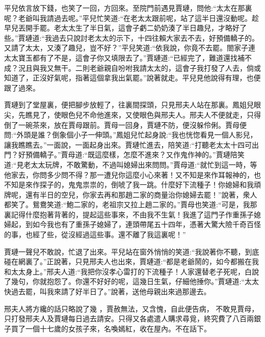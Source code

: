 \begin{parag}
    平兒依言放下錢，也笑了一回，方回來。至院門前遇見賈璉，問他:“太太在那裏呢？老爺叫我請過去呢。”平兒忙笑道:“在老太太跟前呢，站了這半日還沒動呢。趁早兒丟開手罷。老太太生了半日氣，這會子虧二奶奶湊了半日趣兒，才略好了些。”賈璉道:“我過去只說討老太太的示下，十四往賴大家去不去，好預備轎子的。又請了太太，又湊了趣兒，豈不好？”平兒笑道:“依我說，你竟不去罷。閤家子連太太寶玉都有了不是，這會子你又填限去了。”賈璉道:“已經完了，難道還找補不成？況且與我又無干。二則老爺親自吩咐我請太太的，這會子我打發了人去，倘或知道了，正沒好氣呢，指著這個拿我出氣罷。”說著就走。平兒見他說得有理，也便跟了過來。
\end{parag}


\begin{parag}
    賈璉到了堂屋裏，便把腳步放輕了，往裏間探頭，只見邢夫人站在那裏。鳳姐兒眼尖，先瞧見了，使眼色兒不命他進來，又使眼色與邢夫人。邢夫人不便就走，只得倒了一碗茶來，放在賈母跟前。賈母一回身，賈璉不防，便沒躲伶俐。賈母便問:“外頭是誰？倒象個小子一伸頭。”鳳姐兒忙起身說:“我也恍惚看見一個人影兒，讓我瞧瞧去。”一面說，一面起身出來。賈璉忙進去，陪笑道:“打聽老太太十四可出門？好預備轎子。”賈母道:“既這麼樣，怎麼不進來？又作鬼作神的。”賈璉陪笑道:“見老太太玩牌，不敢驚動，不過叫媳婦出來問問。”賈母道:“就忙到這一時，等他家去，你問多少問不得？那一遭兒你這麼小心來著！又不知是來作耳報神的，也不知是來作探子的，鬼鬼祟祟的，倒唬了我一跳。什麼好下流種子！你媳婦和我頑牌呢，還有半日的空兒，你家去再和那趙二家的商量治你媳婦去罷！”說著，衆人都笑了。鴛鴦笑道:“鮑二家的，老祖宗又拉上趙二家的。”賈母也笑道:“可是，我那裏記得什麼抱著背著的，提起這些事來，不由我不生氣！我進了這門子作重孫子媳婦起，到如今我也有了重孫子媳婦了，連頭帶尾五十四年，憑著大驚大險千奇百怪的事，也經了些，從沒經過這些事。還不離了我這裏呢！”
\end{parag}


\begin{parag}
    賈璉一聲兒不敢說，忙退了出來。平兒站在窗外悄悄的笑道:“我說著你不聽，到底碰在網裏了。”正說著，只見邢夫人也出來，賈璉道:“都是老爺鬧的，如今都搬在我和太太身上。”邢夫人道:“我把你沒孝心雷打的下流種子！人家還替老子死呢，白說了幾句，你就抱怨了。你還不好好的呢，這幾日生氣，仔細他捶你。”賈璉道:“太太快過去罷，叫我來請了好半日了。”說著，送他母親出來過那邊去。
\end{parag}


\begin{parag}
    邢夫人將方纔的話只略說了幾 ，賈赦無法，又含愧，自此便告病， 不敢見賈母，只打發邢夫人及賈璉每日過去請安。只得又各處遣人購求尋覓，終究費了八百兩銀子買了一個十七歲的女孩子來，名喚嫣紅，收在屋內。不在話下。
\end{parag}


